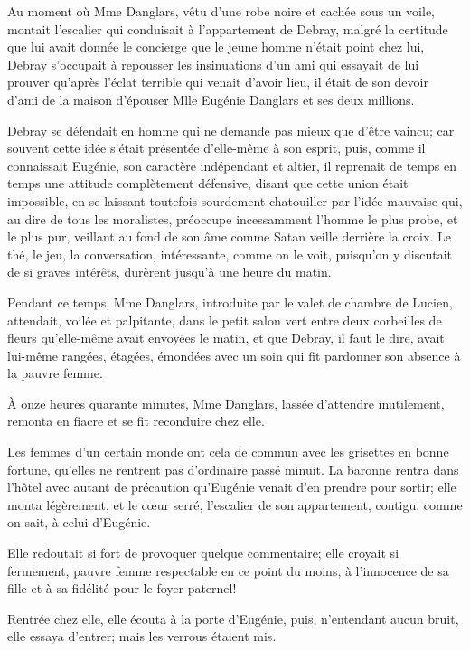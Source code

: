 Au moment où Mme Danglars, vêtu d'une robe noire et cachée sous un voile, montait l'escalier qui conduisait à l'appartement de Debray, malgré la certitude que lui avait donnée le concierge que le jeune homme n'était point chez lui, Debray s'occupait à repousser les insinuations d'un ami qui essayait de lui prouver qu'après l'éclat terrible qui venait d'avoir lieu, il était de son devoir d'ami de la maison d'épouser Mlle Eugénie Danglars et ses deux millions. 

Debray se défendait en homme qui ne demande pas mieux que d'être vaincu; car souvent cette idée s'était présentée d'elle-même à son esprit, puis, comme il connaissait Eugénie, son caractère indépendant et altier, il reprenait de temps en temps une attitude complètement défensive, disant que cette union était impossible, en se laissant toutefois sourdement chatouiller par l'idée mauvaise qui, au dire de tous les moralistes, préoccupe incessamment l'homme le plus probe, et le plus pur, veillant au fond de son âme comme Satan veille derrière la croix. Le thé, le jeu, la conversation, intéressante, comme on le voit, puisqu'on y discutait de si graves intérêts, durèrent jusqu'à une heure du matin. 

Pendant ce temps, Mme Danglars, introduite par le valet de chambre de Lucien, attendait, voilée et palpitante, dans le petit salon vert entre deux corbeilles de fleurs qu'elle-même avait envoyées le matin, et que Debray, il faut le dire, avait lui-même rangées, étagées, émondées avec un soin qui fit pardonner son absence à la pauvre femme. 

À onze heures quarante minutes, Mme Danglars, lassée d'attendre inutilement, remonta en fiacre et se fit reconduire chez elle. 

Les femmes d'un certain monde ont cela de commun avec les grisettes en bonne fortune, qu'elles ne rentrent pas d'ordinaire passé minuit. La baronne rentra dans l'hôtel avec autant de précaution qu'Eugénie venait d'en prendre pour sortir; elle monta légèrement, et le cœur serré, l'escalier de son appartement, contigu, comme on sait, à celui d'Eugénie. 

Elle redoutait si fort de provoquer quelque commentaire; elle croyait si fermement, pauvre femme respectable en ce point du moins, à l'innocence de sa fille et à sa fidélité pour le foyer paternel! 

Rentrée chez elle, elle écouta à la porte d'Eugénie, puis, n'entendant aucun bruit, elle essaya d'entrer; mais les verrous étaient mis. 

